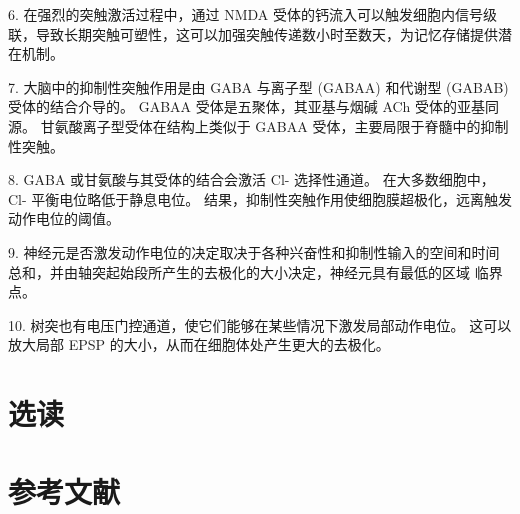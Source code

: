 6. 在强烈的突触激活过程中，通过 NMDA 受体的钙流入可以触发细胞内信号级联，导致长期突触可塑性，这可以加强突触传递数小时至数天，为记忆存储提供潜在机制。 

7. 大脑中的抑制性突触作用是由 GABA 与离子型 (GABAA) 和代谢型 (GABAB) 受体的结合介导的。 GABAA 受体是五聚体，其亚基与烟碱 ACh 受体的亚基同源。 甘氨酸离子型受体在结构上类似于 GABAA 受体，主要局限于脊髓中的抑制性突触。 

8. GABA 或甘氨酸与其受体的结合会激活 Cl- 选择性通道。 在大多数细胞中，Cl- 平衡电位略低于静息电位。 结果，抑制性突触作用使细胞膜超极化，远离触发动作电位的阈值。 

9. 神经元是否激发动作电位的决定取决于各种兴奋性和抑制性输入的空间和时间总和，并由轴突起始段所产生的去极化的大小决定，神经元具有最低的区域 临界点。 

10. 树突也有电压门控通道，使它们能够在某些情况下激发局部动作电位。 这可以放大局部 EPSP 的大小，从而在细胞体处产生更大的去极化。


\section{选读}

\section{参考文献}




